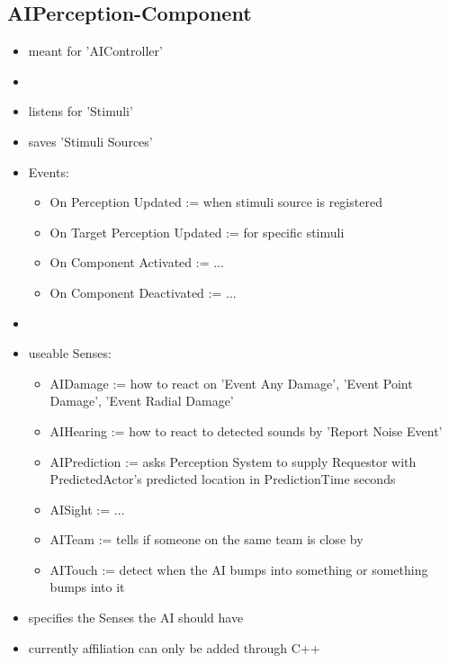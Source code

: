         \subsection{AIPerception-Component}
            \begin{itemize}
                \item meant for 'AIController'
                \item 
                \item listens for 'Stimuli'
                \item saves 'Stimuli Sources'
                \item Events:
                \begin{itemize}
                    \item On Perception Updated := when stimuli source is registered
                    \item On Target Perception Updated := for specific stimuli
                    \item On Component Activated := ... 
                    \item On Component Deactivated := ...
                \end{itemize}
                \item 
                \item useable Senses:
                \begin{itemize}
                    \item AIDamage := how to react on 'Event Any Damage', 'Event Point Damage', 'Event Radial Damage'
                    \item AIHearing := how to react to detected sounds by 'Report Noise Event'
                    \item AIPrediction := asks Perception System to supply Requestor with PredictedActor's predicted location in PredictionTime seconds
                    \item AISight := ...
                    \item AITeam := tells if someone on the same team is close by
                    \item AITouch := detect when the AI bumps into something or something bumps into it
                \end{itemize}
                \item specifies the Senses the AI should have
                \item currently affiliation can only be added through C++
            \end{itemize}

